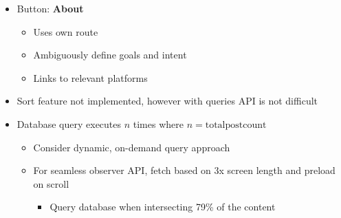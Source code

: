 \documentclass[7px]{article}
\begin{document}
{\begin{itemize}[label=\textsection]
\begin{itemize}[label=$\multimapdotinv$, leftmargin=3mm]
          \footnotesize{
            \begin{itemize}[label=$\multimapinv$]
              \item Transform to: \textbf{Categories}
                \begin{itemize}
                  \item Shows a succinct list of categories and post count
                  \item Use a separate route which nests category routes spreading relevant pages
                \end{itemize}
            \end{itemize}
          }
          \small
        \item Button: \textbf{About}
          \footnotesize{
            \begin{itemize}[label=$\multimapinv$]
              \item Uses own route
              \item Ambiguously define goals and intent
              \item Links to relevant platforms
            \end{itemize}
          }
          \small
      \end{itemize}
  \end{itemize}
}
{
  \raggedright
  \begin{itemize}[label=\blitzb]
    \small
    \item Sort feature not implemented, however with queries API is not difficult
    \item Database query executes $n$ times where $n = \text{total}$\hspace{0.7mm}$\text{post}$\hspace{0.7mm}$\text{count}$
      \footnotesize
      \begin{itemize}[label=$\multimapinv$]
        \item Consider dynamic, on-demand query approach
        \item For seamless {\cap} observer API, fetch based on 3x screen length and preload on scroll
          \begin{itemize}[label=$\multimapinv$]
            \item Query database when intersecting 79\% of the content
          \end{itemize}
      \end{itemize}
      \small
  \end{itemize}
}
\end{document}
